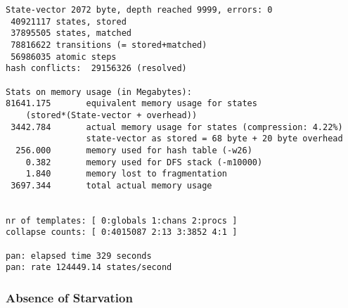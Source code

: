 \documentclass{llncs}
\begin{document}
\begin{lstlisting}[frame=single]
State-vector 2072 byte, depth reached 9999, errors: 0
 40921117 states, stored
 37895505 states, matched
 78816622 transitions (= stored+matched)
 56986035 atomic steps
hash conflicts:  29156326 (resolved)

Stats on memory usage (in Megabytes):
81641.175       equivalent memory usage for states 
    (stored*(State-vector + overhead))
 3442.784       actual memory usage for states (compression: 4.22%)
                state-vector as stored = 68 byte + 20 byte overhead
  256.000       memory used for hash table (-w26)
    0.382       memory used for DFS stack (-m10000)
    1.840       memory lost to fragmentation
 3697.344       total actual memory usage


nr of templates: [ 0:globals 1:chans 2:procs ]
collapse counts: [ 0:4015087 2:13 3:3852 4:1 ]

pan: elapsed time 329 seconds
pan: rate 124449.14 states/second
\end{lstlisting}

\subsubsection{Absence of Starvation}
\label{mc:app:unb:dead}
\end{document}
